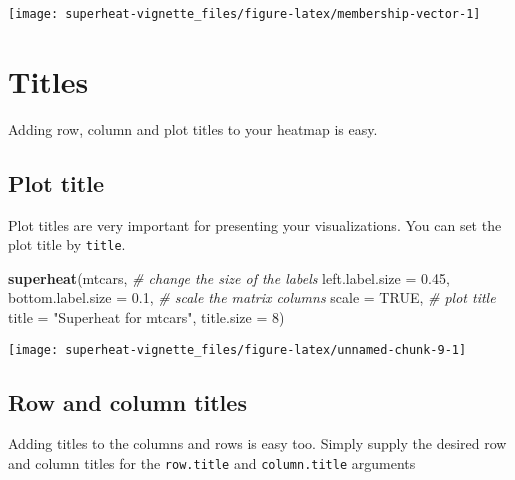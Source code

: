 \documentclass[]{book}
\newenvironment{Shaded}{\begin{snugshade}}{\end{snugshade}}
\newcommand{\KeywordTok}[1]{\textcolor[rgb]{0.13,0.29,0.53}{\textbf{{#1}}}}
\newcommand{\DataTypeTok}[1]{\textcolor[rgb]{0.13,0.29,0.53}{{#1}}}
\newcommand{\DecValTok}[1]{\textcolor[rgb]{0.00,0.00,0.81}{{#1}}}
\newcommand{\FloatTok}[1]{\textcolor[rgb]{0.00,0.00,0.81}{{#1}}}
\newcommand{\StringTok}[1]{\textcolor[rgb]{0.31,0.60,0.02}{{#1}}}
\newcommand{\CommentTok}[1]{\textcolor[rgb]{0.56,0.35,0.01}{\textit{{#1}}}}
\newcommand{\OtherTok}[1]{\textcolor[rgb]{0.56,0.35,0.01}{{#1}}}
\newcommand{\NormalTok}[1]{{#1}}
\theoremstyle{definition}
\theoremstyle{definition}
\theoremstyle{remark}
\begin{document}
\begin{center}\texttt{[image: superheat-vignette\_files/figure-latex/membership-vector-1]} \end{center}

\chapter{Titles}\label{titles}

Adding row, column and plot titles to your heatmap is easy.

\section{Plot title}\label{plot-title}

Plot titles are very important for presenting your visualizations. You
can set the plot title by \texttt{title}.

\begin{Shaded}
\begin{Highlighting}[]
\KeywordTok{superheat}\NormalTok{(mtcars,}
          \CommentTok{# change the size of the labels}
          \DataTypeTok{left.label.size =} \FloatTok{0.45}\NormalTok{,}
          \DataTypeTok{bottom.label.size =} \FloatTok{0.1}\NormalTok{,}
          \CommentTok{# scale the matrix columns}
          \DataTypeTok{scale =} \OtherTok{TRUE}\NormalTok{,}
          \CommentTok{# plot title}
          \DataTypeTok{title =} \StringTok{"Superheat for mtcars"}\NormalTok{,}
          \DataTypeTok{title.size =} \DecValTok{8}\NormalTok{)}
\end{Highlighting}
\end{Shaded}

\begin{center}\texttt{[image: superheat-vignette\_files/figure-latex/unnamed-chunk-9-1]} \end{center}

\section{Row and column titles}\label{row-and-column-titles}

Adding titles to the columns and rows is easy too. Simply supply the
desired row and column titles for the \texttt{row.title} and
\texttt{column.title} arguments
\end{document}
